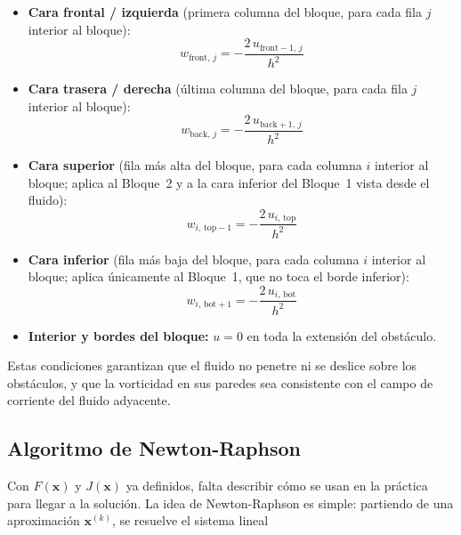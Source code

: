\documentclass[12pt, a4paper]{article}
\begin{document}
\begin{itemize}

  \item \textbf{Cara frontal / izquierda}
        (primera columna del bloque, para cada fila $j$ interior al bloque):
  \begin{equation}
    w_{\text{front},\,j} = -\frac{2\,u_{\text{front}-1,\,j}}{h^{2}}
  \end{equation}

  \item \textbf{Cara trasera / derecha}
        (última columna del bloque, para cada fila $j$ interior al bloque):
  \begin{equation}
    w_{\text{back},\,j} = -\frac{2\,u_{\text{back}+1,\,j}}{h^{2}}
  \end{equation}

  \item \textbf{Cara superior}
        (fila más alta del bloque, para cada columna $i$ interior al bloque;
        aplica al Bloque~2 y a la cara inferior del Bloque~1 vista desde el fluido):
  \begin{equation}
    w_{i,\,\text{top}-1} = -\frac{2\,u_{i,\,\text{top}}}{h^{2}}
  \end{equation}

  \item \textbf{Cara inferior}
        (fila más baja del bloque, para cada columna $i$ interior al bloque;
        aplica únicamente al Bloque~1, que no toca el borde inferior):
  \begin{equation}
    w_{i,\,\text{bot}+1} = -\frac{2\,u_{i,\,\text{bot}}}{h^{2}}
  \end{equation}

  \item \textbf{Interior y bordes del bloque:} $u = 0$ en toda la extensión
        del obstáculo.

\end{itemize}

Estas condiciones garantizan que el fluido no penetre ni se deslice sobre los
obstáculos, y que la vorticidad en sus paredes sea consistente con el campo de
corriente del fluido adyacente.

\subsection{Algoritmo de Newton-Raphson}

Con $F(\mathbf{x})$ y $J(\mathbf{x})$ ya definidos, falta describir cómo se
usan en la práctica para llegar a la solución. La idea de Newton-Raphson es
simple: partiendo de una aproximación $\mathbf{x}^{(k)}$, se resuelve el
sistema lineal
\end{document}

